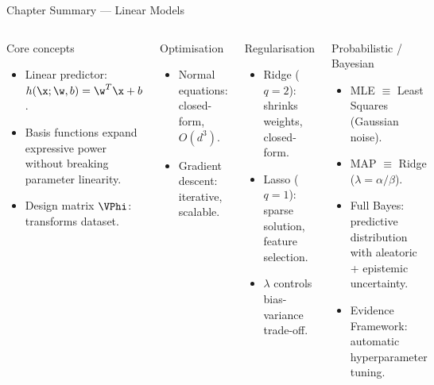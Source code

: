 \begin{frame}{Chapter Summary — Linear Models}
  \begin{columns}[T]
  \begin{block}{Core concepts}
    \begin{itemize}
      \item Linear predictor: $h(\x;\w,b)=\w^T\x+b$.
      \item Basis functions expand expressive power without breaking parameter linearity.
      \item Design matrix $\VPhi$: transforms dataset.
    \end{itemize}
  \end{block}
  \begin{block}{Optimisation}
    \begin{itemize}
      \item Normal equations: closed-form, $O(d^3)$.
      \item Gradient descent: iterative, scalable.
    \end{itemize}
  \end{block}
  \begin{block}{Regularisation}
    \begin{itemize}
      \item Ridge ($q{=}2$): shrinks weights, closed-form.
      \item Lasso ($q{=}1$): sparse solution, feature selection.
      \item $\lambda$ controls bias-variance trade-off.
    \end{itemize}
  \end{block}
  \begin{block}{Probabilistic / Bayesian}
    \begin{itemize}
      \item MLE $\equiv$ Least Squares (Gaussian noise).
      \item MAP $\equiv$ Ridge ($\lambda{=}\alpha/\beta$).
      \item Full Bayes: predictive distribution with aleatoric + epistemic uncertainty.
      \item Evidence Framework: automatic hyperparameter tuning.
    \end{itemize}
  \end{block}
  \end{columns}
\end{frame}


